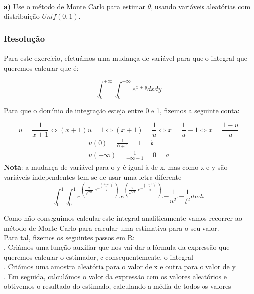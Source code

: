 \documentclass{article}
\begin{document}
			\paragraph{}
			\textbf{a)} Use o método de Monte Carlo para estimar $\theta$, usando variáveis aleatórias com distribuição $Unif(0, 1)$.
				
				\subsubsection*{Resolução}
				\paragraph{}
					Para este exercício, efetuámos uma mudança de variável para que o integral que queremos calcular que é:
					
					\begin{equation*}
						\int^{+\infty}_{0}\int^{+\infty}_{0} e^{x + y} dxdy
					\end{equation*}
					
					\noindent Para que o domínio de integração esteja entre 0 e 1, fizemos a seguinte conta:
					
					\begin{equation*}
						u = \frac{1}{x + 1} \Leftrightarrow 
						{(x + 1)u = 1} \Leftrightarrow 
						(x + 1) = \frac{1}{u} \Leftrightarrow 
						{x = \frac{1}{u} - 1} \Leftrightarrow 
						x = \frac{1-u}{u}
					\end{equation*}
					\begin{equation*}
						\begin{aligned}
							u(0) = \frac{1}{0 + 1} = 1 = b\\
							u(+\infty) = \frac{1}{+\infty + 1} = 0 = a
						\end{aligned}
					\end{equation*}
					\textbf{Nota}: a mudança de variável para o y é igual à de x, mas como x e y são variáveis independentes tem-se de usar uma letra diferente
					\begin{equation*}
						\int^{1}_{0}\int^{1}_{0} e^{\left(\frac{2}{\sqrt{2\pi}}.e^{-\frac{\left(\frac{(1-u)}{u}\right)^2}{2}}\right)}.
						e^{\left(\frac{2}{\sqrt{2\pi}}.e^{-\frac{\left(\frac{(1-t)}{t}\right)^2}{2}}\right)}.{-\frac{1}{u^2}}.{-\frac{1}{t^2}}dudt
					\end{equation*}					
					
			\noindent Como não conseguimos calcular este integral analiticamente vamos recorrer ao método de Monte Carlo para calcular uma estimativa para o seu valor.\\
				       Para tal, fizemos os seguintes passos em R:\\					
			. Criámos uma função auxiliar que nos vai dar a fórmula da expressão que queremos calcular o estimador, e consequentemente, o integral\\
			. Criámos uma amostra aleatória para o valor de x e outra para o valor de y\\
			. Em seguida, calculámos o valor da expressão com os valores aleatórios e obtivemos o resultado do estimado, calculando a média de todos os valores 
			
\end{document}
